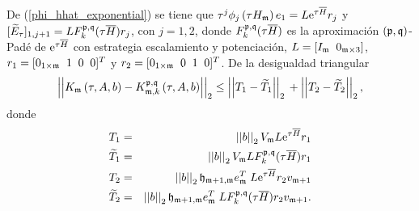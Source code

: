 De (\ref{phi_hhat_exponential}) se tiene que
$\tau^j \phi_j\left( \tau H_{\mathfrak{m}} \right) e_1 = L \mathrm{e}^{\tau \overline{H}} r_j$
y
$[\widetilde{E}_{\tau}]_{1,j+1} = L F_k^{\mathfrak{p},\mathfrak{q}}(\tau \overline{H}) r_j$,
con $j=1,2$, donde $F_k^{\mathfrak{p},\mathfrak{q}}(\tau \overline{H})$ es la aproximación $(\mathfrak{p},\mathfrak{q})$-Padé de $\mathrm{e}^{\tau \overline{H}}$ con estrategia escalamiento y potenciación,
$ L=[I_{\mathfrak{m}} \;\; 0_{\mathfrak{m}\times 3}] $, $r_1=[0_{1\times \mathfrak{m}}\;\; 1 \;\;0 \;\;0]^T$ y $r_2=[0_{1\times \mathfrak{m}}\;\; 0 \;\;1 \;\;0]^{T}$. De la desigualdad triangular
\begin{equation}\label{proffktheouneq}
\left\lvert\left\lvert   K_{\mathfrak{m}}\left( \tau , A , b \right) -
K_{\mathfrak{m},k}^{\mathfrak{p},\mathfrak{q}}\left( \tau, A , b \right)\right\rvert\right\rvert_2
\leq \left\lvert\left\lvert T_1 -
\widetilde{T}_1\right\rvert\right\rvert_2 \\
+\left\lvert\left\lvert T_2 - \widetilde{T}_2
\right\rvert\right\rvert_2,
\end{equation}
donde
\begin{eqnarray*}
	T_1&=&\left\lvert \left\lvert b \right\rvert \right\rvert_2 V_{\mathfrak{m}} L \mathrm{e}^{\tau \overline{H}} r_1\\
	\widetilde{T}_1&=&\left\lvert \left\lvert b \right\rvert \right\rvert_2 V_{\mathfrak{m}} L F_k^{\mathfrak{p},\mathfrak{q}}(\tau \overline{H}) r_1\\
	T_2&=&\left\lvert \left\lvert b \right\rvert \right\rvert_2 \mathfrak{h}_{\mathfrak{m}+1,\mathfrak{m}}e_{\mathfrak{m}}^T\;L \mathrm{e}^{\tau \overline{H}} r_2 v_{\mathfrak{m}+1}\\
	\widetilde{T}_2&=&\left\lvert \left\lvert b \right\rvert \right\rvert_2 \mathfrak{h}_{\mathfrak{m}+1,\mathfrak{m}}e_{\mathfrak{m}}^T\;L F_k^{\mathfrak{p},\mathfrak{q}}(\tau \overline{H}) r_2 v_{\mathfrak{m}+1}.
\end{eqnarray*}

